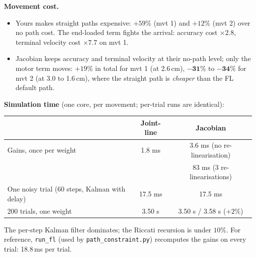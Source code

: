 \documentclass[11pt,a4paper]{article}
\begin{document}
\textbf{Movement cost.}
\begin{itemize}\setlength\itemsep{1pt}
\item \textcolor{joint}{Yours} makes straight paths expensive: $+59\%$ (mvt 1) and $+12\%$ (mvt 2)
over no path cost. The end-loaded term fights the arrival: accuracy cost $\times2.8$, terminal
velocity cost $\times7.7$ on mvt 1.
\item \textcolor{jac}{Jacobian} keeps accuracy and terminal velocity at their no-path level; only the
motor term moves: $+19\%$ in total for mvt 1 (at 2.6\,cm), $\mathbf{-31\%}$ to $\mathbf{-34\%}$
for mvt 2 (at 3.0 to 1.6\,cm), where the straight path is \emph{cheaper} than the FL default path.
\end{itemize}

\noindent\begin{minipage}{\linewidth}
\textbf{Simulation time} (one core, per movement; per-trial runs are identical):

\begin{center}
\renewcommand{\arraystretch}{1.15}
\begin{tabular}{lcc}
\toprule
 & \textcolor{joint}{Joint-line} & \textcolor{jac}{Jacobian}\\
\midrule
Gains, once per weight & 1.8 ms & 3.6 ms (no re-linearisation)\\
 & & 83 ms (3 re-linearisations)\\
One noisy trial (60 steps, Kalman with delay) & 17.5 ms & 17.5 ms\\
200 trials, one weight & 3.50 s & 3.50 s / 3.58 s ($+2\%$)\\
\bottomrule
\end{tabular}
\end{center}
\end{minipage}

The per-step Kalman filter dominates; the Riccati recursion is under $10\%$.
For reference, \texttt{run\_fl} (used by \texttt{path\_constraint.py}) recomputes the gains
on every trial: 18.8\,ms per trial.

\end{document}
